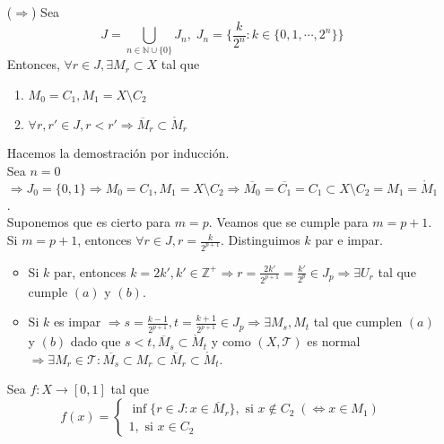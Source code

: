 \begin{dem}
  \begin{enumerate}[label=(\roman*)]
    \item [($\Rightarrow$)] Sea 
      \[ 
        J = \bigcup_{n \in \mathbb{N} \cup \{ 0 \}} J_{n}, \; J_{n} = \{ \frac{k}{2^{n}} : k \in \{  0,1, \cdots , 2^{n} \} \}
      \] 
      Entonces, $\forall r \in J, \exists M_{r} \subset X$ tal que
      \begin{enumerate}
        \item $M_{0} = C_{1}, M_{1} = X \setminus C_{2}$
        \item $\forall r, r' \in J, r < r' \Rightarrow \overline{M}_{r} \subset \mathring{M}_{r}$
      \end{enumerate}

      Hacemos la demostración por inducción.  \\

      Sea $n = 0$ $\Rightarrow J_{0} = \{ 0, 1 \} \Rightarrow M_{0} = C_{1}, M_{1} = X \setminus C_{2} \Rightarrow \overline{M_{0}} = \overline{C_{1}} = C_{1} \subset X \setminus C_{2} = M_{1} = \mathring{M}_{1}$. \\

      Suponemos que es cierto para $ m = p$. Veamos que se cumple para $m = p + 1$. \\

      Si $m = p+1$, entonces $\forall r \in J, r = \frac{k}{2^{p+1}}$. Distinguimos $k$ par e impar.

      \begin{itemize}
        \item Si $k$ par, entonces $k = 2k', k' \in \mathbb{Z}^{+} \Rightarrow r = \frac{2k'}{2^{p+1}} = \frac{k'}{2^{p}} \in J_{p} \Rightarrow \exists U_{r} $ tal que cumple $(a)$ y $(b)$.
        \item Si $k$ es impar $\Rightarrow s = \frac{k - 1}{2^{p+1}}, t = \frac{k + 1}{2^{p+1}} \in J_{p} \Rightarrow \exists M_{s}, M_{t}$ tal que cumplen $(a)$ y $(b)$ dado que $ s < t , \overline{M}_{s} \subset \mathring{M}_{t}$ y como $( X, \mathcal{T} )$ es normal $\Rightarrow \exists M_{r} \in \mathcal{T}: \overline{M_{s}} \subset M_{r} \subset \overline{M}_{r} \subset \mathring{M}_{t}$.
      \end{itemize}

      Sea $f: X \to [0,1]$ tal que
      \[ 
        f(x) =
        \begin{cases}
          \inf \{ r \in J: x \in \overline{M}_{r} \}, \text{ si } x \not \in C_{2} \; (\Leftrightarrow x \in M_{1}) \\
          1, \text{ si } x \in C_{2}
        \end{cases} 
      \] 


\end{enumerate}
\end{dem}
